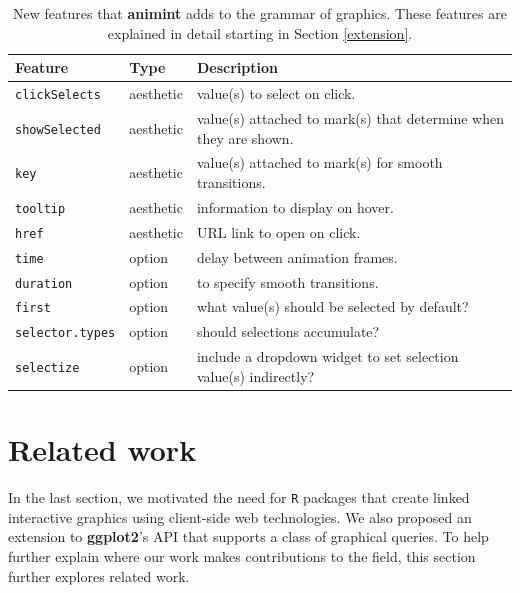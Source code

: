 \documentclass[12pt,]{article}
\theoremstyle{definition}
\theoremstyle{definition}
\theoremstyle{definition}
\theoremstyle{remark}
\begin{document}
\begin{table}

\caption{
New features that \textbf{animint} adds to the grammar of graphics. These features are explained
in detail starting in Section \ref{extension}.
}\label{tab:overview}
\small
\begin{tabularx}{\textwidth}{|l|l|l|}
\hline
Feature & Type & Description \\
\hline
\texttt{clickSelects} & aesthetic & value(s) to select on click. \\
\texttt{showSelected} & aesthetic & value(s) attached to mark(s) that determine when they are shown.  \\
\texttt{key} & aesthetic & value(s) attached to mark(s) for smooth transitions. \\
\texttt{tooltip} & aesthetic & information to display on hover. \\
\texttt{href} & aesthetic & URL link to open on click. \\
\texttt{time} & option & delay between animation frames.  \\
\texttt{duration} & option & to specify smooth transitions.  \\
\texttt{first} & option & what value(s) should be selected by default?  \\
\texttt{selector.types} & option & should selections accumulate?  \\
\texttt{selectize} & option & include a dropdown widget to set selection value(s) indirectly? \\
\hline
\end{tabularx}

\end{table}

\hypertarget{related-work}{%
\section{Related work}\label{related-work}}

In the last section, we motivated the need for \texttt{R} packages that
create linked interactive graphics using client-side web technologies.
We also proposed an extension to \textbf{ggplot2}'s API that supports a
class of graphical queries. To help further explain where our work makes
contributions to the field, this section further explores related work.
\end{document}
